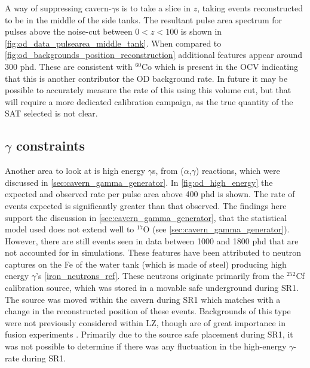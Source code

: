 \par
A way of suppressing cavern-$\gamma$s is to take a slice in $z$, taking events reconstructed to be in the middle of the side tanks.
The resultant pulse area spectrum for pulses above the noise-cut between $0<z<100$ is shown in \autoref{fig:od_data_pulsearea_middle_tank}.
When compared to \autoref{fig:od_backgrounds_position_reconstruction} additional features appear around 300 phd.
These are consistent with ${}^{60}$Co which is present in the OCV indicating that this is another contributor the OD background rate.
In future it may be possible to accurately measure the rate of this using this volume cut, but that will require a more dedicated calibration campaign, as the true quantity of the SAT selected is not clear.




\subsection{$\gamma$ constraints}
\par
Another area to look at is high energy $\gamma$s, from ($\alpha$,$\gamma$) reactions, which were discussed in \autoref{sec:cavern_gamma_generator}.
In \autoref{fig:od_high_energy} the expected and observed rate per pulse area above 400 phd is shown.
The rate of events expected is significantly greater than that observed.
The findings here support the discussion in \autoref{sec:cavern_gamma_generator}, that the statistical model used does not extend well to ${}^{17}$O (see \autoref{sec:cavern_gamma_generator}).
However, there are still events seen in data between 1000 and 1800 phd that are not accounted for in simulations.
These features have been attributed to neutron captures on the Fe of the water tank (which is made of steel) producing high energy $\gamma$'s \autoref{iron_neutrons_ref}.
These neutrons originate primarily from the ${}^{252}$Cf calibration source, which was stored in a movable safe underground during SR1.
The source was moved within the cavern during SR1 which matches with a change in the reconstructed position of these events.
Backgrounds of this type were not previously considered within LZ, though are of great importance in fusion experiments \cite{iter_neutrons_ref}.
Primarily due to the source safe placement during SR1, it was not possible to determine if there was any fluctuation in the high-energy $\gamma$-rate during SR1.




